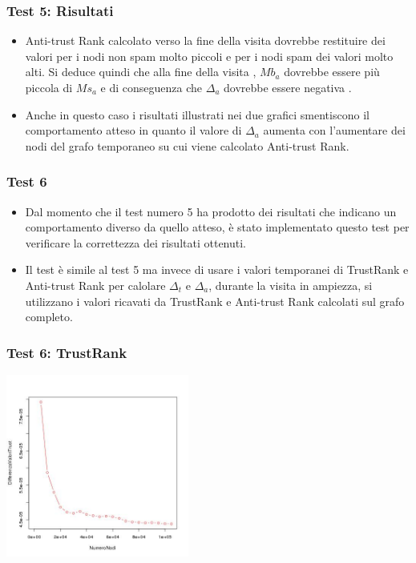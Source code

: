 \documentclass{beamer}
\begin{document}
\begin{frame}
\frametitle{Test 5: Risultati}
\begin{itemize}
 \item<1-> Anti-trust Rank calcolato verso la fine della visita dovrebbe restituire dei valori per i nodi non spam molto piccoli  e per i nodi spam dei valori molto alti. Si deduce quindi che alla fine della visita ,  \(Mb_a\) dovrebbe essere più piccola di \(Ms_a\) e di conseguenza che \(\Delta_a\) dovrebbe essere negativa . 
 \item<2-> Anche in questo caso i risultati illustrati nei due grafici smentiscono il comportamento atteso in quanto il valore di \(\Delta_a\) aumenta con l'aumentare dei nodi del grafo temporaneo su cui viene calcolato Anti-trust Rank.
 \end{itemize}
\end{frame}
\begin{frame}
\frametitle{Test 6}
\begin{itemize}
 \item Dal momento che il test numero 5 ha prodotto dei risultati che indicano un comportamento diverso da quello atteso, è stato implementato questo test per verificare la correttezza dei risultati ottenuti.
 \item Il test è simile al test 5 ma invece di usare i valori temporanei di TrustRank e Anti-trust Rank per calolare \(\Delta_t\) e \(\Delta_a\), durante la visita in ampiezza, si utilizzano i valori ricavati da TrustRank e Anti-trust Rank calcolati sul grafo completo.
 \end{itemize}
\end{frame}
\begin{frame}
\frametitle{Test 6: TrustRank}
\begin{center}
 \includegraphics[height=6cm]{immagini/test6/averageCompleteTest_trust_62}
\end{center}
\end{frame}
\end{document}
